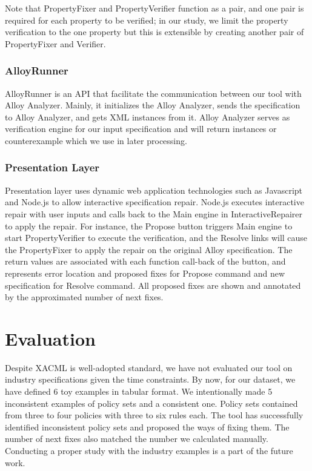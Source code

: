 \documentclass{acm_proc_article-sp}
\begin{document}
Note that PropertyFixer and PropertyVerifier function as a pair, and one pair is required for each property to be verified; in our study, we limit the property verification to the one property but this is extensible by creating another pair of PropertyFixer and Verifier.

\subsubsection{AlloyRunner}
AlloyRunner is an API that facilitate the communication between our tool with Alloy Analyzer. Mainly, it initializes the Alloy Analyzer, sends the specification to Alloy Analyzer, and gets XML instances from it. Alloy Analyzer serves as verification engine for our input specification and will return instances or counterexample which we use in later processing.

\subsubsection{Presentation Layer}
Presentation layer uses dynamic web application technologies such as Javascript and Node.js to allow interactive specification repair. Node.js executes interactive repair with user inputs and calls back to the Main engine in InteractiveRepairer to apply the repair. For instance, the Propose button triggers Main engine to start PropertyVerifier to execute the verification, and the Resolve links will cause the PropertyFixer to apply the repair on the original Alloy specification. The return values are associated with each function call-back of the button, and represents error location and proposed fixes for Propose command and new specification for Resolve command. All proposed fixes are shown and annotated by the approximated number of next fixes.

\section{Evaluation}

Despite XACML is well-adopted standard, we have not evaluated our tool on industry specifications given the time constraints. By now, for our dataset, we have defined 6 toy examples in tabular format. We intentionally made 5 inconsistent examples of policy sets and a consistent one. Policy sets contained from three to four policies with three to six rules each. The tool has successfully identified inconsistent policy sets and proposed the ways of fixing them. The number of next fixes also matched the number we calculated manually. Conducting a proper study with the industry examples is a part of the future work.
\end{document}
